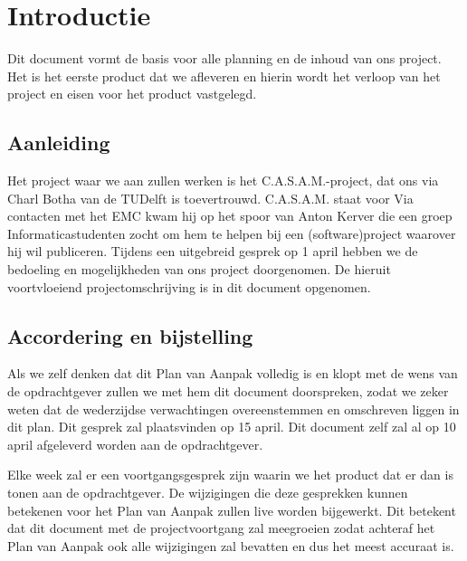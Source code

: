 \section{Introductie}

Dit document vormt de basis voor alle planning en de inhoud van ons project.
Het is het eerste product dat we afleveren en hierin wordt het verloop van het project en eisen voor het product vastgelegd.

\subsection{Aanleiding}

Het project waar we aan zullen werken is het C.A.S.A.M.-project, dat ons via Charl Botha van de TUDelft is toevertrouwd.
C.A.S.A.M. staat voor
Via contacten met het EMC kwam hij op het spoor van Anton Kerver die een groep Informaticastudenten zocht om hem te helpen bij een (software)project waarover hij wil publiceren.
Tijdens een uitgebreid gesprek op 1 april hebben we de bedoeling en mogelijkheden van ons project doorgenomen.
De hieruit voortvloeiend projectomschrijving is in dit document opgenomen.

\subsection{Accordering en bijstelling}

Als we zelf denken dat dit Plan van Aanpak volledig is en klopt met de wens van de opdrachtgever zullen we met hem dit document doorspreken, zodat we zeker weten dat de wederzijdse verwachtingen overeenstemmen en omschreven liggen in dit plan.
Dit gesprek zal plaatsvinden op 15 april.
Dit document zelf zal al op 10 april afgeleverd worden aan de opdrachtgever.

Elke week zal er een voortgangsgesprek zijn waarin we het product dat er dan is tonen aan de opdrachtgever.
De wijzigingen die deze gesprekken kunnen betekenen voor het Plan van Aanpak zullen live worden bijgewerkt.
Dit betekent dat dit document met de projectvoortgang zal meegroeien zodat achteraf het Plan van Aanpak ook alle wijzigingen zal bevatten en dus het meest accuraat is.



